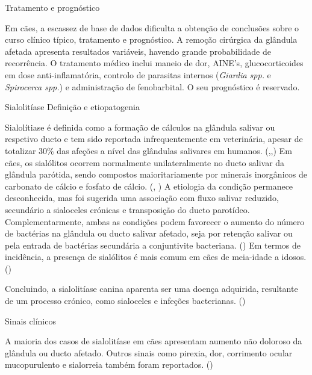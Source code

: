 Tratamento e prognóstico


Em cães, a escassez de base de dados dificulta a obtenção de conclusões sobre o curso clínico típico, tratamento e prognóstico. \cite{bsava_2020_gastro,Mukaratirwa2015} A remoção cirúrgica da glândula afetada apresenta resultados variáveis, havendo grande probabilidade de recorrência. \cite{Mukaratirwa2015,bsava_2020_gastro} O tratamento médico inclui maneio de dor, AINE’s, glucocorticoides em dose anti-inflamatória, controlo de parasitas internos (\textit{Giardia spp.} e \textit{Spirocerca spp.}) e administração de fenobarbital. \cite{reiter_bsava_2018} O seu prognóstico é reservado. \cite{bsava_2020_gastro,Mukaratirwa2015,reiter_bsava_2018}



Sialolitíase
Definição e etiopatogenia


Sialolítiase é definida como a formação de cálculos na glândula salivar ou respetivo ducto e tem sido reportada infrequentemente em veterinária, apesar de totalizar 30\% das afeções a nível das glândulas salivares em humanos. (\cite{perez-ecija_granulomatous_2012},\cite{Han2016},\cite{Ryan2008}) Em cães, os sialólitos ocorrem normalmente unilateralmente no ducto salivar da glândula parótida, sendo compostos maioritariamente por minerais inorgânicos de carbonato de cálcio e fosfato de cálcio. (\cite{perez-ecija_granulomatous_2012}, \cite{Han2016}) A etiologia da condição permanece desconhecida, mas foi sugerida uma associação com fluxo salivar reduzido, secundário a sialoceles crónicas e transposição do ducto parotídeo. \cite{perez-ecija_granulomatous_2012,Han2016,Ryan2008} Complementarmente, ambas as condições podem favorecer o aumento do número de bactérias na glândula ou ducto salivar afetado, seja por retenção salivar ou pela entrada de bactérias secundária a conjuntivite bacteriana. (\cite{Han2016}) 
Em termos de incidência, a presença de sialólitos é mais comum em cães de meia-idade a idosos. (\cite{Han2016}) 


Concluindo, a sialolitíase canina aparenta ser uma doença adquirida, resultante de um processo crónico, como sialoceles e infeções bacterianas. (\cite{Han2016})


Sinais clínicos


A maioria dos casos de sialolitíase em cães apresentam aumento não doloroso da glândula ou ducto afetado. \cite{Han2016,perez-ecija_granulomatous_2012}Outros sinais como pirexia, dor, corrimento ocular mucopurulento e sialorreia também foram reportados. (\cite{Han2016})


